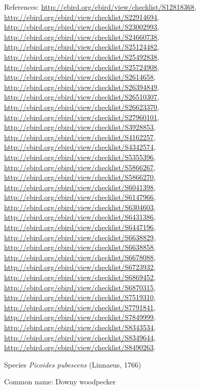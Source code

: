 \documentclass[9pt, article]{memoir}
\begin{document}
\begin{multicols}{2}
References: 
\url{http://ebird.org/ebird/view/checklist/S12818368}, 
\url{http://ebird.org/ebird/view/checklist/S22914694}, 
\url{http://ebird.org/ebird/view/checklist/S23002993}, 
\url{http://ebird.org/ebird/view/checklist/S24660738}, 
\url{http://ebird.org/ebird/view/checklist/S25124482}, 
\url{http://ebird.org/ebird/view/checklist/S25492838}, 
\url{http://ebird.org/ebird/view/checklist/S25724908}, 
\url{http://ebird.org/ebird/view/checklist/S2614658}, 
\url{http://ebird.org/ebird/view/checklist/S26394849}, 
\url{http://ebird.org/ebird/view/checklist/S26510307}, 
\url{http://ebird.org/ebird/view/checklist/S26623370}, 
\url{http://ebird.org/ebird/view/checklist/S27960101}, 
\url{http://ebird.org/ebird/view/checklist/S3928853}, 
\url{http://ebird.org/ebird/view/checklist/S4162257}, 
\url{http://ebird.org/ebird/view/checklist/S4342574}, 
\url{http://ebird.org/ebird/view/checklist/S5355396}, 
\url{http://ebird.org/ebird/view/checklist/S5866267}, 
\url{http://ebird.org/ebird/view/checklist/S5866270}, 
\url{http://ebird.org/ebird/view/checklist/S6041398}, 
\url{http://ebird.org/ebird/view/checklist/S6147966}, 
\url{http://ebird.org/ebird/view/checklist/S6304603}, 
\url{http://ebird.org/ebird/view/checklist/S6431386}, 
\url{http://ebird.org/ebird/view/checklist/S6447196}, 
\url{http://ebird.org/ebird/view/checklist/S6638829}, 
\url{http://ebird.org/ebird/view/checklist/S6638858}, 
\url{http://ebird.org/ebird/view/checklist/S6678088}, 
\url{http://ebird.org/ebird/view/checklist/S6723932}, 
\url{http://ebird.org/ebird/view/checklist/S6869452}, 
\url{http://ebird.org/ebird/view/checklist/S6870315}, 
\url{http://ebird.org/ebird/view/checklist/S7519310}, 
\url{http://ebird.org/ebird/view/checklist/S7791841}, 
\url{http://ebird.org/ebird/view/checklist/S7849999}, 
\url{http://ebird.org/ebird/view/checklist/S8343534}, 
\url{http://ebird.org/ebird/view/checklist/S8349644}, 
\url{http://ebird.org/ebird/view/checklist/S8490263}.

\vspace{6pt}\noindent\hspace{36pt}Species \textit{Picoides pubescens} (Linnaeus, 1766)


Common name: Downy woodpecker


\end{multicols}
\end{document}
